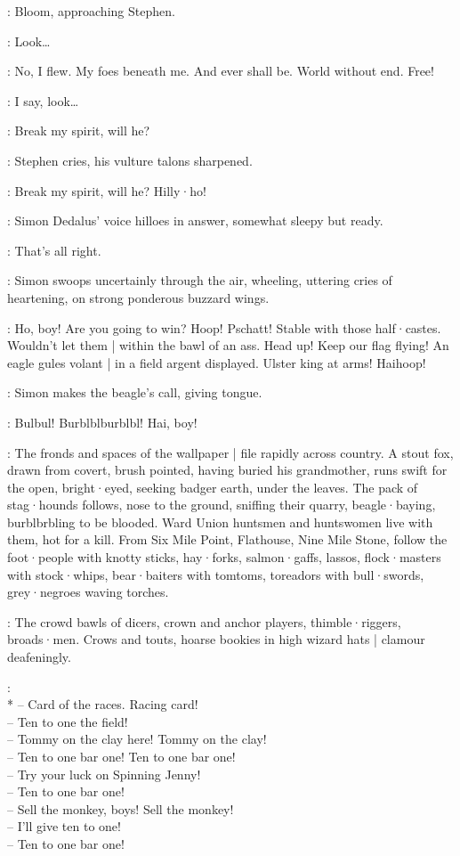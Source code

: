 :
Bloom,
approaching Stephen.

\Bloom:
Look…

\Stephen:
No,
I flew.
My foes beneath me.
And ever shall be.
World without end.
Free!

\Bloom:
I say,
look…

\Stephen:
Break my spirit,
will he?
%

:
Stephen cries,
his vulture talons sharpened.

\Stephen:
Break my spirit,
will he?
Hilly·ho!

:
Simon Dedalus' voice hilloes in answer,
somewhat sleepy but ready.

\Simon:
That's all right.

:
Simon swoops uncertainly through the air,
wheeling,
uttering cries of heartening,
on strong ponderous buzzard wings.

\Simon:
Ho,
boy!
Are you going to win?
Hoop!
Pschatt!
Stable with those half·castes.
Wouldn't let them |
within the bawl of an ass.
Head up!
Keep our flag flying!
An eagle gules volant |
in a field argent displayed.
Ulster king at arms!
Haihoop!

:
Simon makes the beagle's call,
giving tongue.

\Simon:
Bulbul!
Burblblburblbl!
Hai,
boy!

:
The fronds and spaces of the wallpaper |
file rapidly across country.
A stout fox,
drawn from covert,
brush pointed,
having buried his grandmother,
runs swift for the open,
bright·eyed,
seeking badger earth,
under the leaves.
The pack of stag·hounds follows,
nose to the ground,
sniffing their quarry,
beagle·baying,
burblbrbling to be blooded.
Ward Union huntsmen and huntswomen live with them,
hot for a kill.
From Six Mile Point,
Flathouse,
Nine Mile Stone,
follow the foot·people with knotty sticks,
hay·forks,
salmon·gaffs,
lassos,
flock·masters with stock·whips,
bear·baiters with tomtoms,
toreadors with bull·swords,
grey·negroes waving torches.

:
The crowd bawls of dicers,
crown and anchor players,
thimble·riggers,
broads·men.
Crows and touts,
hoarse bookies in high wizard hats |
clamour deafeningly.

\Crowd:\\*
-- Card of the races. Racing card!\\
-- Ten to one the field!\\
-- Tommy on the clay here! Tommy on the clay!\\
-- Ten to one bar one! Ten to one bar one!\\
-- Try your luck on Spinning Jenny!\\
-- Ten to one bar one!%
\\
-- Sell the monkey, boys! Sell the monkey!\\
-- I'll give ten to one!\\
-- Ten to one bar one!

